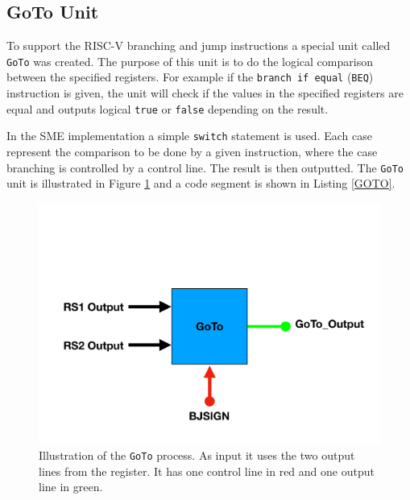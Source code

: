     \subsection{GoTo Unit}
        To support the RISC-V branching and jump instructions a special unit called \texttt{GoTo} was created. The purpose of this unit is to do the logical comparison between the specified registers. For example if the \texttt{branch if equal} (\texttt{BEQ}) instruction is given, the unit will check if the values in the specified registers are equal and outputs logical \texttt{true} or \texttt{false} depending on the result.
        
        In the SME implementation a simple \texttt{switch} statement is used. Each case represent the comparison to be done by a given instruction, where the case branching is controlled by a control line. The result is then outputted. The \texttt{GoTo} unit is illustrated in Figure \ref{fig:GOTO} and a code segment is shown in Listing \ref{GOTO}.
        
        
        \begin{figure}[h!]
            \centering
            \includegraphics[scale=0.35]{pictures/GOTO.pdf}
            \caption{Illustration of the \texttt{GoTo} process. As input it uses the two output lines from the register. It has one control line in red and one output line in green.}
            \label{fig:GOTO}
        \end{figure}
    

